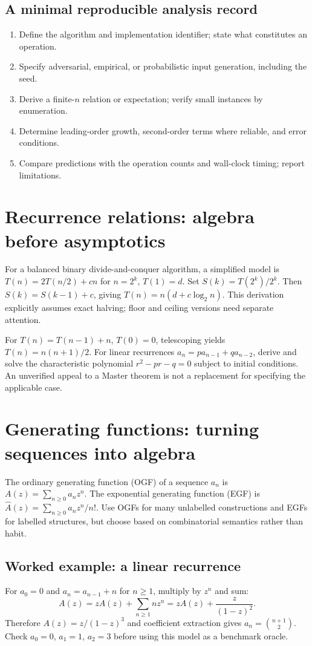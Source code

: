 \documentclass[11pt]{article}
\begin{document}
\subsection{A minimal reproducible analysis record}
\begin{enumerate}
\item Define the algorithm and implementation identifier; state what constitutes an operation.
\item Specify adversarial, empirical, or probabilistic input generation, including the seed.
\item Derive a finite-$n$ relation or expectation; verify small instances by enumeration.
\item Determine leading-order growth, second-order terms where reliable, and error conditions.
\item Compare predictions with the operation counts and wall-clock timing; report limitations.
\end{enumerate}

\section{Recurrence relations: algebra before asymptotics}
For a balanced binary divide-and-conquer algorithm, a simplified model is $T(n)=2T(n/2)+cn$ for $n=2^k$, $T(1)=d$. Set $S(k)=T(2^k)/2^k$. Then $S(k)=S(k-1)+c$, giving $T(n)=n(d+c\log_2 n)$. This derivation explicitly assumes exact halving; floor and ceiling versions need separate attention.

For $T(n)=T(n-1)+n$, $T(0)=0$, telescoping yields $T(n)=n(n+1)/2$. For linear recurrences $a_n=pa_{n-1}+qa_{n-2}$, derive and solve the characteristic polynomial $r^2-pr-q=0$ subject to initial conditions. An unverified appeal to a Master theorem is not a replacement for specifying the applicable case.

\section{Generating functions: turning sequences into algebra}
The ordinary generating function (OGF) of a sequence $a_n$ is $A(z)=\sum_{n\ge0}a_nz^n$. The exponential generating function (EGF) is $\widehat A(z)=\sum_{n\ge0}a_n z^n/n!$. Use OGFs for many unlabelled constructions and EGFs for labelled structures, but choose based on combinatorial semantics rather than habit.

\subsection{Worked example: a linear recurrence}
For $a_0=0$ and $a_n=a_{n-1}+n$ for $n\ge1$, multiply by $z^n$ and sum:
\[
A(z)=zA(z)+\sum_{n\ge1}nz^n
=zA(z)+\frac{z}{(1-z)^2}.
\]
Therefore $A(z)=z/(1-z)^3$ and coefficient extraction gives $a_n=\binom{n+1}{2}$. Check $a_0=0$, $a_1=1$, $a_2=3$ before using this model as a benchmark oracle.
\end{document}
